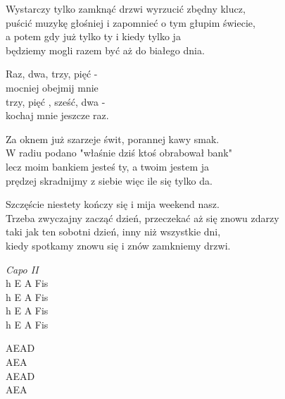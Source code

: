 \begin{text}
    \small{
    \hfill\break
    Wystarczy tylko zamknąć drzwi wyrzucić zbędny klucz,\\
    puścić muzykę głośniej i zapomnieć o tym głupim świecie,\\
    a potem gdy już tylko ty i kiedy tylko ja\\
    będziemy mogli razem być aż do białego dnia.

    Raz, dwa, trzy, pięć - \\
    mocniej obejmij mnie\\
    trzy, pięć , sześć, dwa -\\
    kochaj mnie jeszcze raz.

    Za oknem już szarzeje świt, porannej kawy smak.\\
    W radiu podano "właśnie dziś ktoś obrabował bank"\\
    lecz moim bankiem jesteś ty, a twoim jestem ja\\
    prędzej skradnijmy z siebie więc ile się tylko da.

    Szczęście niestety kończy się i mija weekend nasz.\\
    Trzeba zwyczajny zacząć dzień, przeczekać aż się znowu zdarzy\\
    taki jak ten sobotni dzień, inny niż wszystkie dni,\\
    kiedy spotkamy znowu się i znów zamkniemy drzwi.
    }
\end{text}
\begin{chord}
    \small{
    \textit{Capo II}\\
    h E A Fis\\
    h E A Fis\\
    h E A Fis\\
    h E A Fis

    AEAD\\
    AEA\\
    AEAD\\
    AEA
    }
\end{chord}